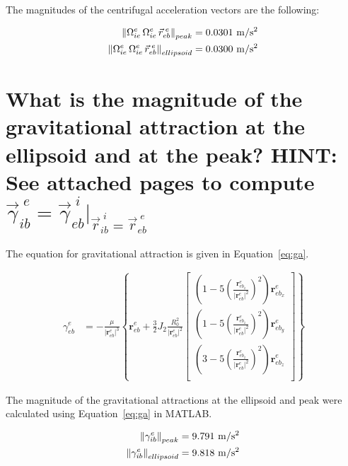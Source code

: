 \begin{parts}
    The magnitudes of the centrifugal acceleration vectors are the following:

    \begin{equation*}
        \begin{split}
            \norm{\Omega^{e}_{ie}\,\Omega^{e}_{ie}\,\vec{r}^{\;e}_{eb}}_{peak} & = 0.0301~\unit{m/s^2} \\
            \norm{\Omega^{e}_{ie}\,\Omega^{e}_{ie}\,\vec{r}^{\;e}_{eb}}_{ellipsoid} & = 0.0300~\unit{m/s^2} \\
        \end{split}
    \end{equation*}

    \part{What is the magnitude of the gravitational attraction at the ellipsoid and at the peak? HINT: See \textbf{attached pages} to compute $\vec{\gamma}^{\;e}_{ib} = \vec{\gamma}^{\;i}_{eb} \vert_{\vec{r}^{\;i}_{ib} = \vec{r}^{\;e}_{eb}}$}

    \solution
    The equation for gravitational attraction is given in Equation~\ref{eq:ga}.

    \begin{equation}
        \begin{split}
            \gamma^e_{eb} & = -\frac{\mu}{\vert \mathbf{r}^e_{eb} \vert^3} \left\{\mathbf{r}^e_{eb} + \frac{3}{2}J_2 \frac{R_0^2}{\vert \mathbf{r}^e_{eb} \vert^2}
            \begin{bmatrix}
                \left(1 - 5\left(\frac{\mathbf{r}^e_{eb_z}}{\vert \mathbf{r}^e_{eb} \vert^2}\right)^2\right)\mathbf{r}^e_{eb_x} \\
                \left(1 - 5\left(\frac{\mathbf{r}^e_{eb_z}}{\vert \mathbf{r}^e_{eb} \vert^2}\right)^2\right)\mathbf{r}^e_{eb_y} \\
                \left(3 - 5\left(\frac{\mathbf{r}^e_{eb_z}}{\vert \mathbf{r}^e_{eb} \vert^2}\right)^2\right)\mathbf{r}^e_{eb_z} \\
            \end{bmatrix}
            \right\}
        \end{split}
        \label{eq:ga}
    \end{equation}

    The magnitude of the gravitational attractions at the ellipsoid and peak were calculated using Equation~\ref{eq:ga} in MATLAB.

    \begin{equation}
        \begin{split}
            \norm{\gamma^e_{ib}}_{peak} & = 9.791~\unit{m/s^2} \\
            \norm{\gamma^e_{ib}}_{ellipsoid} & = 9.818~\unit{m/s^2} \\
        \end{split}
    \end{equation}

\end{parts}